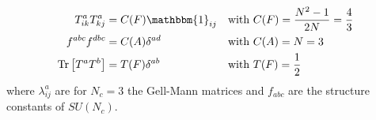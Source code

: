 \begin{align}
T^a_{ik} T^a_{kj} &= C(F)\mathbbm{1}_{ij} && \mbox{with}\ C(F) = \frac{N^2-1}{2N} = \frac{4}{3}\nonumber\\
f^{abc} f^{dbc} &= C(A)\delta^{ad} && \mbox{with}\ C(A) = N = 3\nonumber\\
\mathrm{Tr}\left[T^aT^b\right] &= T(F)\delta^{ab} && \mbox{with}\ T(F) = \frac{1}{2}
\end{align}
where $\lambda^a_{ij}$ are for $N_c = 3$ the Gell-Mann matrices and $f_{abc}$ are the structure constants of $SU(N_c)$.



